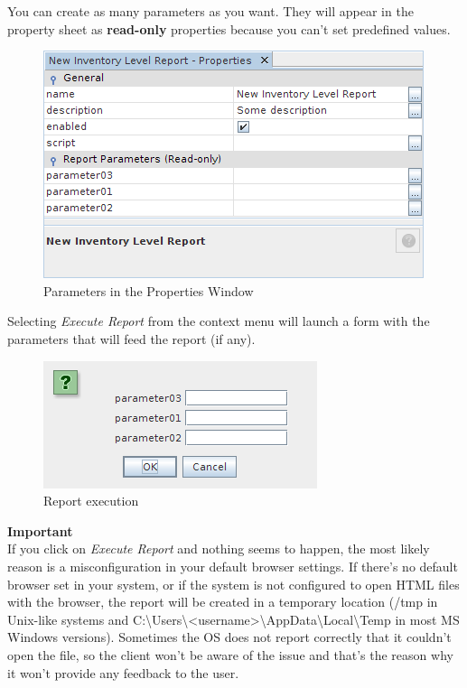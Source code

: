 \documentclass[a4paper]{article}
\begin{document}
			You can create as many parameters as you want. They will appear in the property sheet as \textbf{read-only} properties because you can't set predefined values.
			\begin{figure}[h!]
				\centering
				\includegraphics[scale=0.5]{img/reports_parameters.png}
				\caption{Parameters in the Properties Window}
				\label{fig:reports_parameters}
			\end{figure}
			\newpage
			Selecting \textit{Execute Report} from the context menu will launch a form with the parameters that will feed the report (if any).
			\begin{figure}[h!]
				\centering
				\includegraphics[scale=0.7]{img/reports_execute_report.png}
				\caption{Report execution}
				\label{fig:reports_execute_report}
			\end{figure}
	    
	    
	    \begin{framed} {\large \textbf{Important}} \\
	    	If you click on \textit{Execute Report} and nothing seems to happen, the most likely reason is a misconfiguration in your default browser settings. If there's no default browser set in your system, or if the system is not configured to open HTML files with the browser, the report will be created in a temporary location (/tmp in Unix-like systems and C:\textbackslash{}Users\textbackslash{}\textless{}username\textgreater\textbackslash{}AppData\textbackslash{}Local\textbackslash{}Temp in most MS Windows versions). Sometimes the OS does not report correctly that it couldn't open the file, so the client won't be aware of the issue and that's the reason why it won't provide any feedback to the user. 
	    \end{framed}
	    
\end{document}
